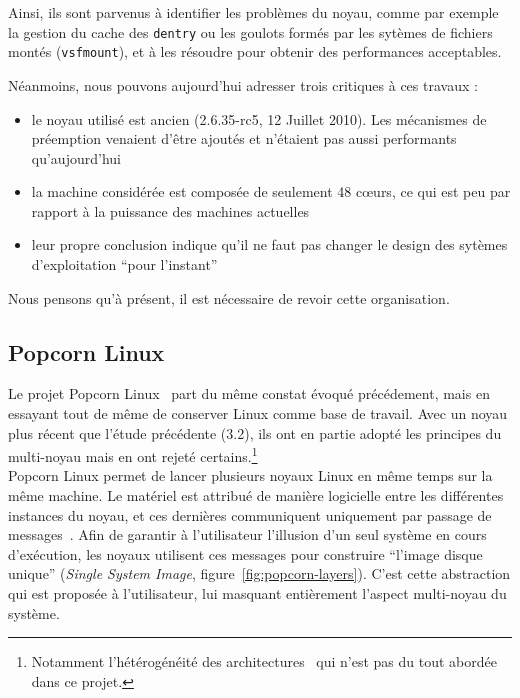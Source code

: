       Ainsi, ils sont parvenus à identifier les problèmes du noyau, comme par
      exemple la gestion du cache des \texttt{dentry} ou les goulots formés par
      les sytèmes de fichiers montés (\texttt{vsfmount}), et à les résoudre pour
      obtenir des performances acceptables.

      Néanmoins, nous pouvons aujourd’hui adresser trois critiques à ces travaux
      :
      \begin{itemize}
        \item le noyau utilisé est ancien (2.6.35-rc5, 12 Juillet 2010). Les
          mécanismes de préemption venaient d’être ajoutés et n’étaient pas
          aussi performants qu'aujourd'hui
        \item la machine considérée est composée de seulement 48 c\oe urs, ce qui
          est peu par rapport à la puissance des machines actuelles
        \item leur propre conclusion indique qu’il ne faut pas changer le design
          des sytèmes d’exploitation ``pour l’instant''
      \end{itemize}
      Nous pensons qu’à présent, il est nécessaire de revoir cette organisation.

      
    \subsection{Popcorn Linux}

      Le projet Popcorn Linux~\citep{barbalacepopcorn} part du même constat
      évoqué précédement, mais en essayant tout de même de conserver Linux comme
      base de travail. Avec un noyau plus récent que l'étude précédente (3.2),
      ils ont en partie adopté les principes du multi-noyau mais en ont rejeté
      certains.\footnote{Notamment l'hétérogénéité des
        architectures~\citep{schupbach2008embracing} qui n'est pas du tout
        abordée dans ce projet.}\\

      Popcorn Linux permet de lancer plusieurs noyaux Linux en même temps sur la
      même machine. Le matériel est attribué de manière logicielle entre les
      différentes instances du noyau, et ces dernières communiquent uniquement
      par passage de messages~\citep{shelton2013popcorn}. Afin de garantir à
      l’utilisateur l’illusion d’un seul système en cours d'exécution, les
      noyaux utilisent ces messages pour construire ``l’image disque unique''
      (\textit{Single System Image}, figure~\ref{fig:popcorn-layers}). C'est
      cette abstraction qui est proposée à l'utilisateur, lui masquant
      entièrement l'aspect multi-noyau du système.

